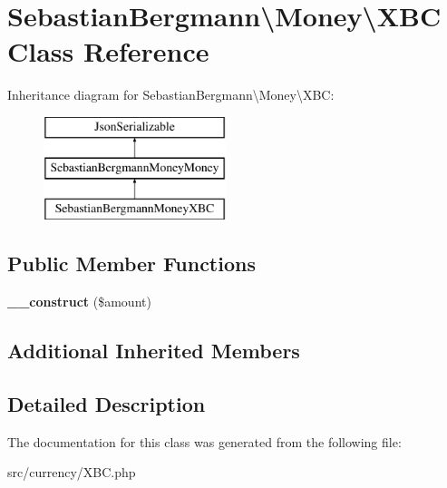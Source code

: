 \hypertarget{classSebastianBergmann_1_1Money_1_1XBC}{}\section{Sebastian\+Bergmann\textbackslash{}Money\textbackslash{}X\+B\+C Class Reference}
\label{classSebastianBergmann_1_1Money_1_1XBC}
Inheritance diagram for Sebastian\+Bergmann\textbackslash{}Money\textbackslash{}X\+B\+C\+:\begin{figure}[H]
\begin{center}
\leavevmode
\includegraphics[height=3.000000cm]{classSebastianBergmann_1_1Money_1_1XBC}
\end{center}
\end{figure}
\subsection*{Public Member Functions}
\begin{DoxyCompactItemize}
\item 
\hypertarget{classSebastianBergmann_1_1Money_1_1XBC_a0e431bfbd581fc5f4fe74912b240749c}{}{\bfseries \+\_\+\+\_\+construct} (\$amount)\label{classSebastianBergmann_1_1Money_1_1XBC_a0e431bfbd581fc5f4fe74912b240749c}

\end{DoxyCompactItemize}
\subsection*{Additional Inherited Members}


\subsection{Detailed Description}


The documentation for this class was generated from the following file\+:\begin{DoxyCompactItemize}
\item 
src/currency/X\+B\+C.\+php\end{DoxyCompactItemize}
